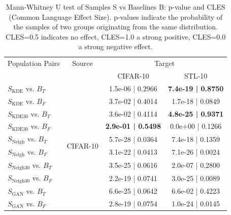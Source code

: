 \begin{table}[ht!]
\centering
\begin{minipage}[t]{0.98\textwidth}
\centering
{\small
\caption{Mann-Whitney U test of Samples S vs Baselines B: p-value and CLES (Common Language Effect Size). p-values indicate the probability of the samples of two groups originating from the same distribution. CLES=0.5 indicates no effect, CLES=1.0 a strong positive, CLES=0.0 a strong negative effect.
}
\begin{tabularx}{0.6\linewidth}{@{}lccc@{}}
\toprule
Population Pairs                 & Source                     & \multicolumn{2}{c}{Target}                            \\
\cmidrule(rl){1-1} \cmidrule(rl){2-2}  \cmidrule(rl){3-4} 
                                 &                            & CIFAR-10                  & STL-10                    \\
 \cmidrule(rl){3-3} \cmidrule(rl){4-4}
$S_{\text{KDE}}$ vs. $B_{T}$     & \multirow{12}{*}{CIFAR-10} & 1.5e-06 | 0.2966          & \textbf{7.4e-19 | 0.8750} \\
$S_{\text{KDE}}$ vs. $B_{F}$     &                            & 3.7e-02 | 0.4014          & 1.7e-18 | 0.0849          \\
$S_{\text{KDE}30}$ vs. $B_{T}$   &                            & 3.6e-02 | 0.4114          & \textbf{4.8e-25 | 0.9371} \\
$S_{\text{KDE}30}$ vs. $B_{F}$   &                            & \textbf{2.9e-01 | 0.5498} & 0.0e+00 | 0.1266          \\
$S_{\text{Neigh}}$ vs. $B_{T}$   &                            & 5.7e-28 | 0.0364          & 7.4e-18 | 0.1359          \\
$S_{\text{Neigh}}$ vs. $B_{F}$   &                            & 3.1e-22 | 0.0413          & 7.1e-26 | 0.0024          \\
$S_{\text{Neigh}30}$ vs. $B_{T}$ &                            & 3.5e-25 | 0.0616          & 2.0e-07 | 0.2800          \\
$S_{\text{Neigh}30}$ vs. $B_{F}$ &                            & 2.2e-19 | 0.0741          & 3.0e-25 | 0.0089          \\
$S_{\text{GAN}}$ vs. $B_{T}$     &                            & 6.6e-25 | 0.0642          & 6.6e-02 | 0.4223          \\
$S_{\text{GAN}}$ vs. $B_{F}$     &                            & 2.8e-19 | 0.0754          & 1.0e-24 | 0.0145          \\

\end{tabularx}}
\end{minipage}
\end{table}
